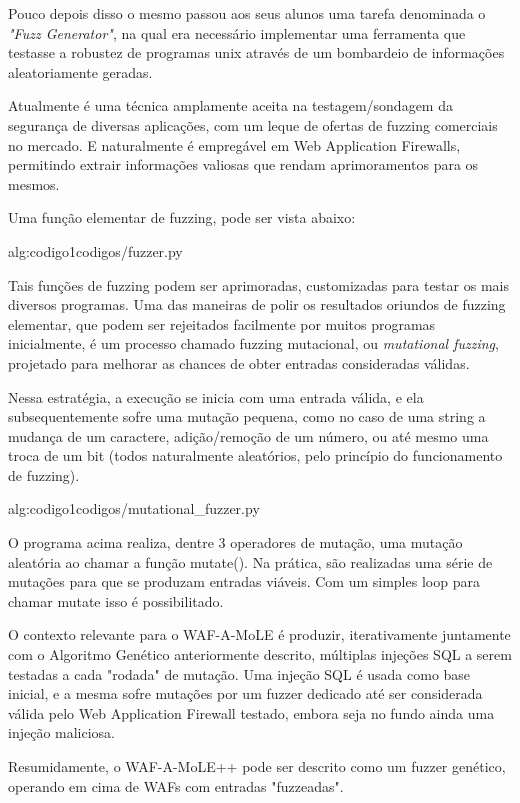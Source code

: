 Pouco depois disso o mesmo passou aos seus alunos uma tarefa denominada o \textit{"Fuzz Generator"}, na qual era necessário implementar uma ferramenta que testasse a robustez de programas unix através de um bombardeio de informações aleatoriamente geradas.

Atualmente é uma técnica amplamente aceita na testagem/sondagem da segurança de diversas aplicações, com um leque de ofertas de fuzzing comerciais no mercado. E naturalmente é empregável em Web Application Firewalls, permitindo extrair informações valiosas que rendam aprimoramentos para os mesmos.

Uma função elementar de fuzzing, pode ser vista abaixo:

 {alg:codigo1}{codigos/fuzzer.py}

\bigskip
Tais funções de fuzzing podem ser aprimoradas, customizadas para testar os mais diversos programas. Uma das maneiras de polir os resultados oriundos de fuzzing elementar, que podem ser rejeitados facilmente por muitos programas inicialmente, é um processo chamado fuzzing mutacional, ou \textit{mutational fuzzing}, projetado para melhorar as chances de obter entradas consideradas válidas.

Nessa estratégia, a execução se inicia com uma entrada válida, e ela subsequentemente sofre uma mutação pequena, como no caso de uma string a mudança de um caractere, adição/remoção de um número, ou até mesmo uma troca de um bit (todos naturalmente aleatórios, pelo princípio do funcionamento de fuzzing).

 {alg:codigo1}{codigos/mutational_fuzzer.py}

\bigskip
O programa acima realiza, dentre 3 operadores de mutação, uma mutação aleatória ao chamar a função mutate(). Na prática, são realizadas uma série de mutações para que se produzam entradas viáveis. Com um simples loop para chamar mutate isso é possibilitado.

O contexto relevante para o WAF-A-MoLE é produzir, iterativamente juntamente com o Algoritmo Genético anteriormente descrito, múltiplas injeções SQL a serem testadas a cada "rodada" de mutação. Uma injeção SQL é usada como base inicial, e a mesma sofre mutações por um fuzzer dedicado até ser considerada válida pelo Web Application Firewall testado, embora seja no fundo ainda uma injeção maliciosa.


Resumidamente, o WAF-A-MoLE++ pode ser descrito como um fuzzer genético, operando em cima de WAFs com entradas "fuzzeadas".

